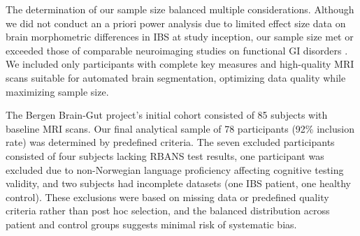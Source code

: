 \documentclass[diagnostics,article,accept,pdftex,moreauthors]{Definitions/mdpi}
\begin{document}
 The determination of our sample size balanced multiple considerations. Although we did not conduct an a priori power analysis due to limited effect size data on brain morphometric differences in IBS at study inception, our sample size met or exceeded those of comparable neuroimaging studies on functional GI disorders \cite{seminowicz2010regional,blankstein2010altered,bhatt2019altered,Skrobisz2022}. We included only participants with complete key measures and high-quality MRI scans suitable for automated brain segmentation, optimizing data quality while maximizing sample size.

 {{The Bergen}  Brain-Gut project's initial cohort consisted of 85 subjects with baseline MRI scans. Our final analytical sample of 78 participants (92\% inclusion rate) was determined by predefined criteria. The seven excluded participants consisted of four subjects lacking RBANS test results, one participant was excluded due to non-Norwegian language proficiency affecting cognitive testing validity, and two subjects had incomplete datasets (one IBS patient, one healthy control). These exclusions were based on missing data or predefined quality criteria rather than post hoc selection, and the balanced distribution across patient and control groups suggests minimal risk of systematic bias.} 
\end{document}
